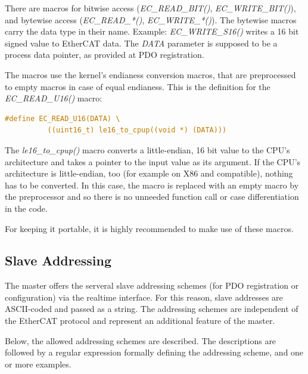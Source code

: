 \documentclass[a4paper,12pt,BCOR6mm,bibtotoc,idxtotoc]{scrbook}
\begin{document}
There are macros for bitwise access (\textit{EC\_READ\_BIT()},
\textit{EC\_WRITE\_BIT()}), and bytewise access
(\textit{EC\_READ\_*()}, \textit{EC\_WRITE\_*()}). The bytewise macros
carry the data type in their name. Example: \textit{EC\_WRITE\_S16()}
writes a 16 bit signed value to EtherCAT data. The \textit{DATA}
parameter is supposed to be a process data pointer, as provided at PDO
registration.

The macros use the kernel's endianess conversion macros, that are
preprocessed to empty macros in case of equal endianess. This is the
definition for the \textit{EC\_\-READ\_\-U16()} macro:

\begin{lstlisting}[language=C]
  #define EC_READ_U16(DATA) \
          ((uint16_t) le16_to_cpup((void *) (DATA)))
\end{lstlisting}

The \textit{le16\_to\_cpup()} macro converts a little-endian, 16 bit
value to the CPU's architecture and takes a pointer to the input value
as its argument. If the CPU's architecture is little-endian, too (for
example on X86 and compatible), nothing has to be converted. In this
case, the macro is replaced with an empty macro by the preprocessor
and so there is no unneeded function call or case differentiation in
the code.

For keeping it portable, it is highly recommended to make use of these
macros.


\subsection{Slave Addressing}
\label{sec:addr}

The master offers the serveral slave addressing schemes (for PDO
registration or configuration) via the realtime interface. For this
reason, slave addresses are ASCII-coded and passed as a
string. The addressing schemes are independent of the EtherCAT
protocol and represent an additional feature of the master.

Below, the allowed addressing schemes are described. The descriptions
are followed by a regular expression formally defining the addressing
scheme, and one or more examples.
\end{document}
